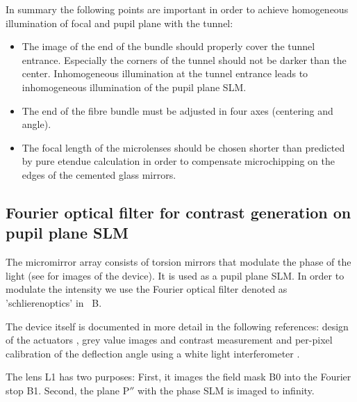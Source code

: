 In summary the following points are important in order to achieve
homogeneous illumination of focal and pupil plane with the tunnel:
\begin{itemize}
\item The image of the end of the bundle should properly cover the
  tunnel entrance. Especially the corners of the tunnel should not be
  darker than the center. Inhomogeneous illumination at the tunnel
  entrance leads to inhomogeneous illumination of the pupil plane SLM.
\item The end of the fibre bundle must be adjusted in four axes
  (centering and angle).
\item The focal length of the microlenses should be chosen shorter
  than predicted by pure etendue calculation in order to compensate
  microchipping %
  on the edges of the cemented glass
  mirrors.
\end{itemize}

\subsection{Fourier optical filter for contrast generation on pupil
  plane SLM}
\label{sec:mma}
The micromirror array consists of
torsion mirrors that modulate the phase of the light (see
 for images of the device). It is used as a pupil plane SLM.
In order to modulate the
intensity we use the Fourier optical filter denoted as
'schlierenoptics' in ~B.

The device itself is documented in more detail in the following
references: design of the actuators \citep{Schmidt2010}, grey value
images and contrast measurement \citep{Berndt2010} and per-pixel
calibration of the deflection angle using a white light interferometer
\citep{Berndt2011,Berndt2007}.


The lens L1 has two purposes: First, it images the field mask B0 into %
the Fourier stop B1. Second, the plane $\textrm{P}''$ with the phase
SLM is imaged to infinity.

